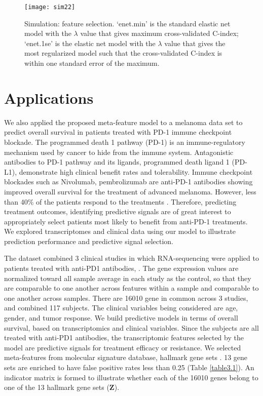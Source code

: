 \begin{figure}
    \centering
    \texttt{[image: sim22]}
    \caption[Simulation: feature selection]{Simulation: feature selection. `enet.min' is the standard elastic net model with the $\lambda$ value that gives maximum cross-validated C-index; `enet.1se' is the elastic net model with the $\lambda$ value that gives the most regularized model such that the cross-validated C-index is within one standard error of the maximum.}
    \label{fig:sim22}
\end{figure}

\section{Applications}
We also applied the proposed meta-feature model to a melanoma data set to predict overall survival in patients treated with PD-1 immune checkpoint blockade. The programmed death 1 pathway (PD-1) is an immune-regulatory mechanism used by cancer to hide from the immune system. Antagonistic antibodies to PD-1 pathway and its ligands, programmed death ligand 1 (PD-L1), demonstrate high clinical benefit rates and tolerability. Immune checkpoint blockades such as Nivolumab, pembrolizumab are anti-PD-1 antibodies showing improved overall survival for the treatment of advanced melanoma. However, less than 40\% of the patients respond to the treatments \citep{moreno2015anti}. Therefore, predicting treatment outcomes, identifying predictive signals are of great interest to appropriately select patients most likely to benefit from anti-PD-1 treatments. We explored transcriptomes and clinical data using our model to illustrate prediction performance and predictive signal selection.

The dataset combined 3 clinical studies in which RNA-sequencing were applied to patients treated with anti-PD1 antibodies, \cite{gide2019distinct, riaz2017tumor, hugo2016genomic}. The gene expression values are normalized toward all sample average in each study as the control, so that they are comparable to one another across features within a sample and comparable to one another across samples. There are 16010 gene in common across 3 studies, and combined 117 subjects. The clinical variables being considered are age, gender, and tumor response. We build predictive models in terms of overall survival, based on transcriptomics and clinical variables. Since the subjects are all treated with anti-PD1 antibodies, the transcriptomic features selected by the model are predictive signals for treatment efficacy or resistance. We selected meta-features from molecular signature database, hallmark gene sets \citep{liberzon2015molecular}. 13 gene sets are enriched \citep{subramanian2005gene} to have false positive rates less than 0.25 (Table \ref{table3.1}). An indicator matrix is formed to illustrate whether each of the 16010 genes belong to one of the 13 hallmark gene sets ($\bm{Z}$). 

